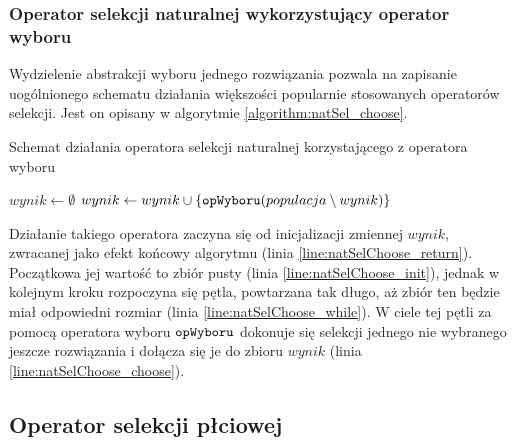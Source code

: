 \documentclass[./FM_mgr.tex]{subfiles}
\begin{document}
\subsubsection{Operator selekcji naturalnej wykorzystujący operator wyboru}

Wydzielenie abstrakcji wyboru jednego rozwiązania pozwala na zapisanie uogólnionego schematu działania większości popularnie stosowanych operatorów selekcji.
Jest on opisany w algorytmie \ref{algorithm:natSel_choose}.

\begin{algorithm}[h]
	\caption{Schemat działania operatora selekcji naturalnej korzystającego z operatora wyboru \label{algorithm:natSel_choose}}
	\begin{algorithmic}[1]
		\Start
		\Var $wynik \gets \emptyset$ 
		\label{line:natSelChoose_init}
		\label{line:natSelChoose_while}
		\State $wynik \gets wynik \cup \{ \mathtt{opWyboru}(populacja \setminus wynik) \}$
		\label{line:natSelChoose_choose}
		\EndWhile
		\State {}
		\label{line:natSelChoose_return}
		\EndOperator
	\end{algorithmic}
\end{algorithm}

Działanie takiego operatora zaczyna się od inicjalizacji zmiennej $wynik$, zwracanej jako efekt końcowy algorytmu (linia \ref{line:natSelChoose_return}). 
Początkowa jej wartość to zbiór pusty (linia \ref{line:natSelChoose_init}), jednak w kolejnym kroku rozpoczyna się pętla, powtarzana tak długo, aż zbiór ten będzie miał odpowiedni rozmiar (linia \ref{line:natSelChoose_while}).
W ciele tej pętli za pomocą operatora wyboru $\mathtt{opWyboru}$ dokonuje się selekcji jednego nie wybranego jeszcze rozwiązania i dołącza się je do zbioru $wynik$ (linia \ref{line:natSelChoose_choose}).

\subsection{Operator selekcji płciowej} \label{subsection:new_genSel}
\end{document}
